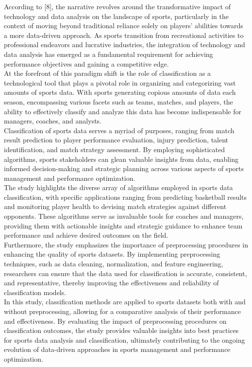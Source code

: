 \documentclass[12pt, English]{article}
\begin{document}
\begin{normalsize}
According to [8], the narrative revolves around the transformative impact of technology and data analysis on the landscape of sports, particularly in the context of moving beyond traditional reliance solely on players' abilities towards a more data-driven approach. As sports transition from recreational activities to professional endeavors and lucrative industries, the integration of technology and data analysis has emerged as a fundamental requirement for achieving performance objectives and gaining a competitive edge.\\
At the forefront of this paradigm shift is the role of classification as a technological tool that plays a pivotal role in organizing and categorizing vast amounts of sports data. With sports generating copious amounts of data each season, encompassing various facets such as teams, matches, and players, the ability to effectively classify and analyze this data has become indispensable for managers, coaches, and analysts.\\
Classification of sports data serves a myriad of purposes, ranging from match result prediction to player performance evaluation, injury prediction, talent identification, and match strategy assessment. By employing sophisticated algorithms, sports stakeholders can glean valuable insights from data, enabling informed decision-making and strategic planning across various aspects of sports management and performance optimization.\\
The study highlights the diverse array of algorithms employed in sports data classification, with specific applications ranging from predicting basketball results and monitoring player health to devising match strategies against different opponents. These algorithms serve as invaluable tools for coaches and managers, providing them with actionable insights and strategic guidance to enhance team performance and achieve desired outcomes on the field.\\
Furthermore, the study emphasizes the importance of preprocessing procedures in enhancing the quality of sports datasets. By implementing preprocessing techniques, such as data cleaning, normalization, and feature engineering, researchers can ensure that the data used for classification is accurate, consistent, and representative, thereby improving the effectiveness and reliability of classification models.\\
In this study, classification methods are applied to sports datasets both with and without preprocessing, allowing for a comparative analysis of their performance and effectiveness. By evaluating the impact of preprocessing procedures on classification outcomes, the study provides valuable insights into best practices for sports data analysis and classification, ultimately contributing to the ongoing evolution of data-driven approaches in sports management and performance optimization.
\\


\end{normalsize}
\end{document}
